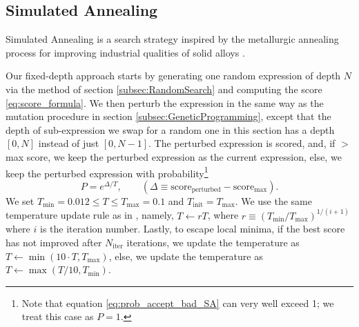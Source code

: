\documentclass[runningheads]{llncs}
\begin{document}
\subsection{Simulated Annealing} \label{subsec:SimulatedAnnealing}
Simulated Annealing is a search strategy inspired by the metallurgic annealing process for improving industrial qualities of solid alloys \cite{vanLaarhoven1987} \cite{10.1145/3449639.3459345}. 
\par Our fixed-depth approach starts by generating one random expression of depth $N$ via the method of section \ref{subsec:RandomSearch} and computing the score \ref{eq:score_formula}. We then perturb the expression in the same way as the mutation procedure in section \ref{subsec:GeneticProgramming}, except that the depth of sub-expression we swap for a random one in this section has a depth $[0,N]$ instead of just $[0,N-1]$. The perturbed expression is scored, and, if $>$ max score, we keep the perturbed expression as the current expression, else, we keep the perturbed expression with probability\footnote{Note that equation \ref{eq:prob_accept_bad_SA} can very well exceed 1; we treat this case as $P=1$.} \cite{10.1145/3449639.3459345}
\begin{equation}
		P = e^{\Delta/T}, \qquad (\Delta \equiv \mathrm{score}_{\mathrm{perturbed}} -   \mathrm{score}_{\mathrm{max}}). \label{eq:prob_accept_bad_SA}
\end{equation}
We set $T_{\mathrm{min}} = 0.012 \leq T \leq T_{\mathrm{max}} = 0.1$ and $T_{\mathrm{init}} = T_{\mathrm{max}}$. We use the same temperature update rule as in \cite{10.1145/3449639.3459345}, namely, $T \gets rT$, where $r \equiv \left(T_{\mathrm{min}}/T_{\mathrm{max}}\right)^{1/(i+1)}$ where $i$ is the iteration number. Lastly, to escape local minima, if the best score has not improved after $N_{\mathrm{iter}}$ iterations, we update the temperature as $T \gets \min{\left(10\cdot T, T_{\mathrm{max}}\right)}$, else, we update the temperature as $T \gets \max{\left(T/10, T_{\mathrm{min}}\right)}$.
\end{document}
